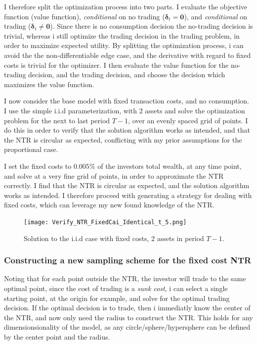 \documentclass[11pt]{article}
\begin{document}
I therefore split the optimization process into two parts. I evaluate the objective function (value function), \textit{conditional} on no trading ($\boldsymbol{\delta}_{t} = \mathbf{0}$), and \textit{conditional} on trading ($\boldsymbol{\delta}_{t} \neq \mathbf{0}$).
Since there is no consumption decision the no-trading decision is trivial, whereas i still optimize the trading decision in the trading problem, in order to maximize expected utility. 
By splitting the optimization process, i can avoid the the non-differentiable edge case, and the derivative with regard to fixed costs is trivial for the optimizer.
I then evaluate the value function for the no-trading decision, and the trading decision, and choose the decision which maximizes the value function.

I now consider the base model with fixed transaction costs, and no consumption. I use the simple i.i.d parameterization, with $2$ assets and solve the optimization problem for the next to last period $T-1$,
over an evenly spaced grid of points. I do this in order to verify that the solution algorithm works as intended, and that the \ac{NTR} is circular as expected, conflicting with my prior assumptions for the proportional case.

I set the fixed costs to $0.005\%$ of the investors total wealth, at any time point, and solve at a very fine grid of points, in order to approximate the \ac{NTR} correctly.
I find that the \ac{NTR} is circular as expected, and the solution algorithm works as intended. I therefore proceed with generating a strategy for dealing with fixed costs, which can leverage my new found knowledge of the \ac{NTR}.
\begin{figure}[!ht]
    \centering
    \texttt{[image: Verify\_NTR\_FixedCai\_Identical\_t\_5.png]}
    \caption{Solution to the i.i.d case with fixed costs, 2 assets in period $T-1$.}
    \label{fig:NTR_verify_fixed_no_correlation}
\end{figure}

\subsubsection{Constructing a new sampling scheme for the fixed cost NTR} \label{Subsubsection: SampleFixed}
Noting that for each point outside the NTR, the investor will trade to the same optimal point, since the cost of trading is a \textit{sunk cost},
i can select a single starting point, at the origin for example, and solve for the optimal trading decision.
If the optimal decision is to trade, then i immediatly know the center of the \ac{NTR}, and now only need the radius to construct the \ac{NTR}.
This holds for any dimensionsionality of the model, as any circle/sphere/hypersphere can be defined by the center point and the radius.
\end{document}
